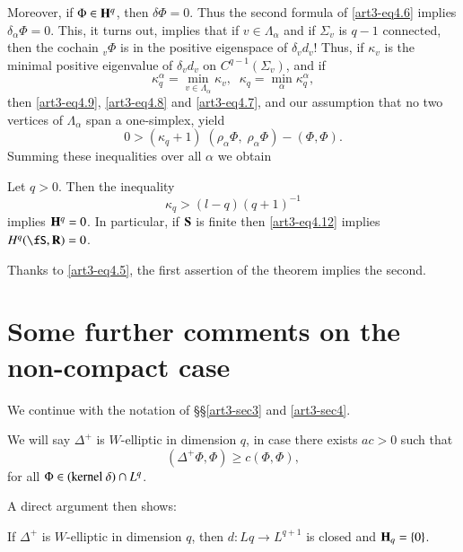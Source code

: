 \begin{remark*}
Moreover, if $\Phi \in \mathbf{H}^q$, then $\delta \Phi=0$. Thus the second formula of \eqref{art3-eq4.6} implies $\delta_\alpha \Phi = 0$. This, it turns out, implies that if $v \in \Lambda_\alpha$ and if $\Sigma_v$ is $q -1$ connected, then the cochain ${}_v\Phi$ is in the positive eigenspace of $\delta_v d_v$! Thus, if $\kappa_v$ is the minimal positive eigenvalue of $\delta_v d_v$ on $C^{q-1} (\Sigma_v)$, and if 
$$
\kappa^\alpha_q = \min\limits_{v \in \Lambda_\alpha} \kappa_v, \;\; \kappa_q = \min\limits_\alpha \kappa^\alpha_q,
$$
then \eqref{art3-eq4.9}, \eqref{art3-eq4.8} and \eqref{art3-eq4.7}, and our assumption that no two vertices of $\Lambda_\alpha$ span a one-simplex, yield
\begin{equation}
0 > (\kappa_q + 1) \; (\rho_\alpha \Phi, \; \rho_\alpha \Phi) - (\Phi, \Phi). \label{art3-eq4.10}
\end{equation}
Summing these inequalities over all $\alpha$ we obtain
\end{remark*}

\setcounter{theorem}{10}
\begin{theorem}\label{art3-thm4.11}
Let $q > 0$. Then the inequality
\begin{equation}
\kappa_q > (l-q) (q+1)^{-1} \label{art3-eq4.12}
\end{equation}
implies $\mathbf{H}^q =0$. In particular, if $\mathbf{S}$ is finite then \eqref{art3-eq4.12} implies $H^q (\fS , \bR) = 0$.
\end{theorem}

\begin{remark*}
Thanks to \eqref{art3-eq4.5}, the first assertion of the theorem implies the second. 
\end{remark*}

\section{Some further comments on the non-compact case}\label{art3-sec5}
We continue with the notation of \S\S\ref{art3-sec3} and \ref{art3-sec4}.

\begin{defi*}
We will say $\Delta^+$ is $W$-elliptic in dimension $q$, in case there exists $a  c > 0$ such that 
$$
(\Delta^+ \Phi, \Phi) \geqslant c (\Phi, \Phi),
$$
for all $\Phi \in ({\rm kernel}~  \delta) \cap L^q$.
\end{defi*}

A direct argument then shows:

\begin{prop*}
If $\Delta^+$ is $W$-elliptic in dimension $q$, then $d : Lq \to L^{q+1}$ is closed and $\mathbf{H}_q = \{0\}$.
\end{prop*}

